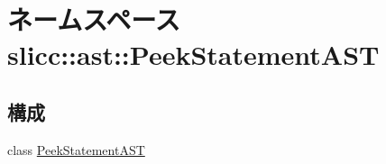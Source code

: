\hypertarget{namespaceslicc_1_1ast_1_1PeekStatementAST}{
\section{ネームスペース slicc::ast::PeekStatementAST}
\label{namespaceslicc_1_1ast_1_1PeekStatementAST}
}
\subsection*{構成}
\begin{DoxyCompactItemize}
\item 
class \hyperlink{classslicc_1_1ast_1_1PeekStatementAST_1_1PeekStatementAST}{PeekStatementAST}
\end{DoxyCompactItemize}
